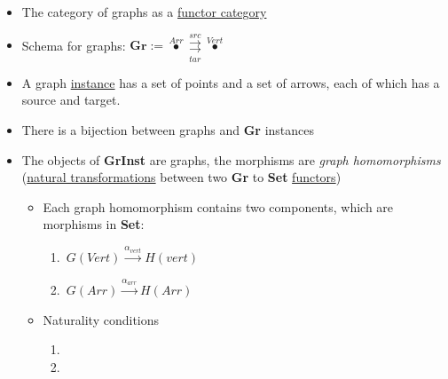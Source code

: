 \begin{itemize}
    \item The category of graphs as a \href{doc/1 math/Seven Sketches in Compositionality/Chapter 3: Databases/3 Functors, natural transformations, and databases/4 Natural transformations/3 Functor category}{functor category}
    \item Schema for graphs: $\mathbf{Gr}:=\boxed{\overset{Arr}\bullet \overset{src}{\underset{tar}{\rightrightarrows}}\overset{Vert}\bullet}$
    \item A graph \href{doc/1 math/Seven Sketches in Compositionality/Chapter 3: Databases/3 Functors, natural transformations, and databases/3 Database instances as Set-valued functors/1 Database instance}{instance} has a set of points and a set of arrows, each of which has a source and target.
    \item There is a bijection between graphs and \textbf{Gr} instances
    \item The objects of \textbf{GrInst} are graphs, the morphisms are \emph{graph homomorphisms} (\href{doc/1 math/Seven Sketches in Compositionality/Chapter 3: Databases/3 Functors, natural transformations, and databases/4 Natural transformations/1 Natural transformation}{natural transformations} between two \textbf{Gr} to \textbf{Set} \href{doc/1 math/Seven Sketches in Compositionality/Chapter 3: Databases/3 Functors, natural transformations, and databases/2 Functors/1 Functor}{functors})
          \begin{itemize}
            \item Each graph homomorphism contains two components, which are morphisms in \textbf{Set}:
                  \begin{enumerate}
                    \item \,$G(Vert) \xrightarrow{\alpha_{vert}} H(vert)$\,
                    \item \,$G(Arr) \xrightarrow{\alpha_{arr}} H(Arr)$\,
                  \end{enumerate}
            \item Naturality conditions
                  \begin{enumerate}
                    \item {}
                    \item {}
                  \end{enumerate}
          \end{itemize}
  \end{itemize}

